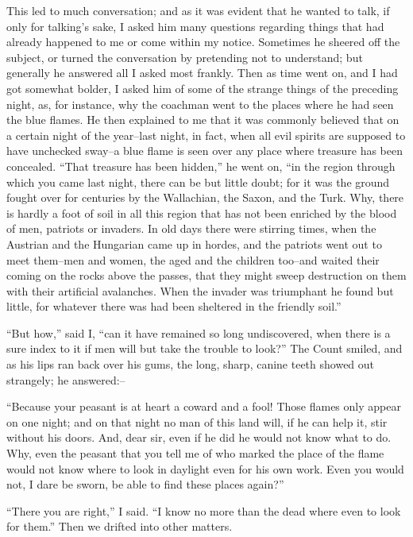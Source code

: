 \documentclass[12pt,openright]{book}
\begin{document}
This led to much conversation; and as it was evident that he wanted to talk, if only for talking’s sake, I asked him many questions regarding things that had already happened to me or come within my notice. Sometimes he sheered off the subject, or turned the conversation by pretending not to understand; but generally he answered all I asked most frankly. Then as time went on, and I had got somewhat bolder, I asked him of some of the strange things of the preceding night, as, for instance, why the coachman went to the places where he had seen the blue flames. He then explained to me that it was commonly believed that on a certain night of the year–last night, in fact, when all evil spirits are supposed to have unchecked sway–a blue flame is seen over any place where treasure has been concealed. “That treasure has been hidden,” he went on, “in the region through which you came last night, there can be but little doubt; for it was the ground fought over for centuries by the Wallachian, the Saxon, and the Turk. Why, there is hardly a foot of soil in all this region that has not been enriched by the blood of men, patriots or invaders. In old days there were stirring times, when the Austrian and the Hungarian came up in hordes, and the patriots went out to meet them–men and women, the aged and the children too–and waited their coming on the rocks above the passes, that they might sweep destruction on them with their artificial avalanches. When the invader was triumphant he found but little, for whatever there was had been sheltered in the friendly soil.”

“But how,” said I, “can it have remained so long undiscovered, when there is a sure index to it if men will but take the trouble to look?” The Count smiled, and as his lips ran back over his gums, the long, sharp, canine teeth showed out strangely; he answered:–

“Because your peasant is at heart a coward and a fool! Those flames only appear on one night; and on that night no man of this land will, if he can help it, stir without his doors. And, dear sir, even if he did he would not know what to do. Why, even the peasant that you tell me of who marked the place of the flame would not know where to look in daylight even for his own work. Even you would not, I dare be sworn, be able to find these places again?”

“There you are right,” I said. “I know no more than the dead where even to look for them.” Then we drifted into other matters.
\end{document}
